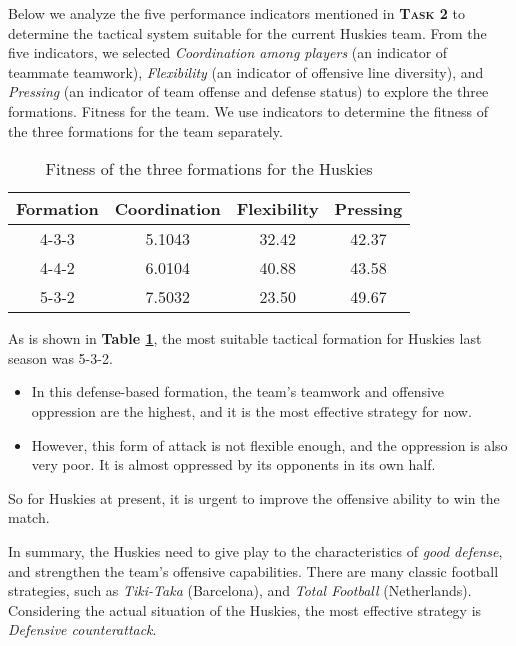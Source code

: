 \documentclass[12pt]{article}  %
\begin{document}
Below we analyze the five performance indicators mentioned in \textbf{\textsc{Task 2}} to determine the tactical system suitable for the current Huskies team. From the five indicators, we selected \textit{Coordination among players} (an indicator of teammate teamwork), \textit{Flexibility} (an indicator of offensive line diversity), and \textit{Pressing} (an indicator of team offense and defense status) to explore the three formations. Fitness for the team. We use indicators to determine the fitness of the three formations for the team separately.

\begin{table}[!htbp]
    \begin{center}
    \caption{Fitness of the three formations for the Huskies}
    \begin{tabular}{cccc}
        \toprule
        Formation  & Coordination & Flexibility & Pressing\\
        \midrule
        \textsf{4-3-3}	&5.1043	&32.42	&42.37\\
        \textsf{4-4-2}	&6.0104	&40.88	&43.58\\
        \textsf{5-3-2}	&7.5032	&23.50	&49.67\\
        \bottomrule
    \end{tabular}\label{tb:Fitness_formations}
    \end{center}
\end{table}

As is shown in \textbf{Table \ref{tb:Fitness_formations}}, the most suitable tactical formation for Huskies last season was \textsf{5-3-2}. 
\begin{itemize}
    \setlength{\parsep}{0ex} %
    \setlength{\topsep}{2ex} %
    \setlength{\itemsep}{1ex} %
    \item In this defense-based formation, the team's teamwork and offensive oppression are the highest, and it is the most effective strategy for now.
    \item However, this form of attack is not flexible enough, and the oppression is also very poor. It is almost oppressed by its opponents in its own half.
\end{itemize}  
So for Huskies at present, it is urgent to improve the offensive ability to win the match.

In summary, the Huskies need to give play to the characteristics of  \textit{good defense}, and strengthen the team's offensive capabilities. There are many classic football strategies, such as \textit{Tiki-Taka} (Barcelona), and \textit{Total Football} (Netherlands). Considering the actual situation of the Huskies, the most effective strategy is \textit{Defensive counterattack}.
\end{document}
